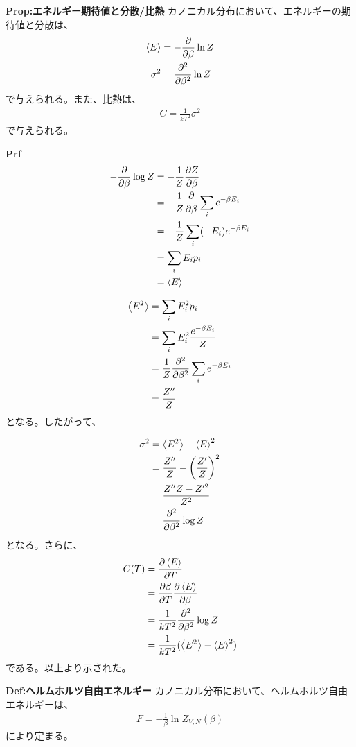 \documentclass[a4paper,11pt]{jsarticle}
\numberwithin{equation}{section}
\begin{document}
\begin{itembox}[l]{\textbf{Prop:エネルギー期待値と分散/比熱}}
  カノニカル分布において、エネルギーの期待値と分散は、
  \begin{align}
    \expval{E} &= -\pdv{\beta}\ln Z\\
    \sigma^2 &= \pdv[2]{\beta}\ln Z
  \end{align}
  で与えられる。また、比熱は、
  \begin{align}
    C = \frac{1}{kT^2}\sigma^2
  \end{align}
  で与えられる。

\end{itembox}
\textbf{Prf}\\
\begin{align}
  -\pdv{\beta}\log Z &= -\frac{1}{Z}\pdv{Z}{\beta}\\
  &= -\frac{1}{Z}\pdv{}{\beta}\sum_{i}e^{-\beta E_{i}}\\
  &= -\frac{1}{Z}\sum_{i}(-E_{i})e^{-\beta E_{i}}\\
  &= \sum_{i}E_{i}p_{i}\\
  &= \expval{E}
\end{align}

\begin{align}
  \ev{E^2} &= \sum_{i}E_{i}^2p_{i}\\
  &=\sum_{i}E_{i}^2\frac{e^{-\beta E_{i}}}{Z}\\
  &=\frac{1}{Z}\pdv[2]{\beta}\sum_{i}e^{-\beta E_{i}}\\
  &=\frac{Z''}{Z}
\end{align}
となる。したがって、

\begin{align}
  \sigma^2 &= \ev{E^2} - \ev{E}^2\\
  &= \frac{Z''}{Z} - \left( \frac{Z'}{Z} \right)^2\\
  &= \frac{Z''Z - Z'^2}{Z^2}\\
  &=\pdv[2]{\beta}\log Z
\end{align}
となる。さらに、
\begin{align}
  C(T)&=\pdv{\ev{E}}{T}\\
  &=\pdv{\beta}{T}\pdv{\ev{E}}{\beta}\\
  &=\frac{1}{kT^2}\pdv[2]{\beta}\log Z\\
  &=\frac{1}{kT^2}(\ev{E^2}-\ev{E}^2)
\end{align}
である。以上より示された。\hfill\qedsymbol\\

\begin{itembox}[l]{\textbf{Def:ヘルムホルツ自由エネルギー}}
  カノニカル分布において、ヘルムホルツ自由エネルギーは、
  \begin{align}
    F = -\frac{1}{\beta}\ln Z_{V,N}(\beta) \label{eq:helmholtz}
  \end{align}
  により定まる。
\end{itembox}
\end{document}
